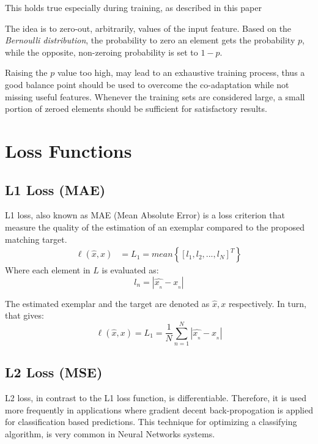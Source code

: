This holds true especially during training, as described in this paper

The idea is to zero-out, arbitrarily, values of
the input feature.
Based on the \emph{Bernoulli distribution}, the probability to zero an element gets the
probability \(p\), while the opposite, non-zeroing probability is set to \(1-p\).

Raising the \(p\) value too high, may lead to an exhaustive training process, thus
a good balance point should be used to overcome the co-adaptation while not missing
useful features. Whenever the training sets are considered large, a small portion
of zeroed elements should be sufficient for satisfactory results.

\section{Loss Functions}
\subsection{L1 Loss (MAE)}
L1 loss, also known as MAE (Mean Absolute Error) is a
loss criterion that measure the quality of the estimation
of an exemplar compared to the proposed matching target.
\begin{align}
    \ell(\hat{x}, x) & = L_{1} = mean\left\{ \left[ l_{1}, l_{2},...,l_{N}\right]^{T}\right\}
\end{align}
Where each element in \(L\) is evaluated as:
\[ l_{n} = |\widehat{x_{_{n}}} - x_{_{n}}| \]

The estimated exemplar and the target are denoted as \(\hat{x}, x\) 
respectively. In turn, that gives:
\begin{equation}
    \ell(\hat{x}, x) = L_{1} = \frac{1}{N} \sum_{n=1}^{N} |\widehat{x_{_{n}}} - x_{_{n}}|
\end{equation}
\subsection{L2 Loss (MSE)}
L2 loss, in contrast to the L1 loss function, is differentiable. Therefore,
it is used more frequently in applications where 
gradient decent back-propogation is applied for classification based
predictions. This technique for optimizing a classifying algorithm,
is very common in Neural Networks systems.

